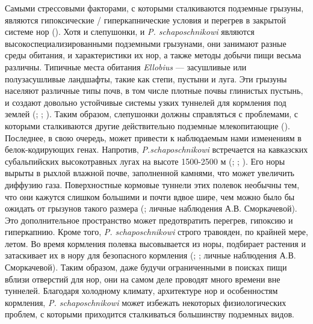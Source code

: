  Самыми стрессовыми факторами, с которыми сталкиваются подземные грызуны, являются гипоксические / гиперкапнические условия и перегрев в закрытой системе нор (\cite{Lacey2000}). Хотя и слепушонки, и \textit{P. schaposchnikowi} являются высокоспециализированными подземными грызунами, они занимают разные среды обитания, и характеристики их нор, а также методы добычи пищи весьма различны. Типичные места обитания \textit{Ellobius} --- засушливые или полузасушливые ландшафты, такие как степи, пустыни и луга. Эти грызуны населяют различные типы почв, в том числе плотные почвы глинистых пустынь, и создают довольно устойчивые системы узких туннелей для кормления под землей (\cite{Ognev1950}; \cite{Gromov1977}; \cite{Shubin1978}). Таким образом, слепушонки должны справляться с проблемами, с которыми сталкиваются другие действительно подземные млекопитающие (\cite{Lacey2000}). Последнее, в свою очередь, может привести к наблюдаемым нами изменениям в белок-кодирующих генах. Напротив, \textit{P.schaposchnikowi} встречается на кавказских субальпийских высокотравных лугах на высоте 1500-2500 м (\cite{Vereshchagin1959}; \cite{Vorontsov1966}; \cite{Krystufek2005}). Его норы вырыты в рыхлой влажной почве, заполненной камнями, что может увеличить диффузию газа. Поверхностные кормовые туннели этих полевок необычны тем, что они кажутся слишком большими и почти вдвое шире, чем можно было бы ожидать от грызунов такого размера (\cite{Vorontsov1966}; личные наблюдения А.В. Сморкачевой). Это дополнительное пространство может предотвратить перегрев, гипоксию и гиперкапнию. Кроме того, \textit{P. schaposchnikowi} строго травояден, по крайней мере, летом. Во время кормления полевка высовывается из норы, подбирает растения и затаскивает их в нору для безопасного кормления (\cite{Gambaryan1957}; \cite{Zimina1977}; личные наблюдения А.В. Сморкачевой). Таким образом, даже будучи ограниченными в поисках пищи вблизи отверстий для нор, они на самом деле проводят много времени вне туннелей. Благодаря холодному климату, архитектуре нор и особенностям кормления, \textit{P. schaposchnikowi} может избежать некоторых физиологических проблем, с которыми приходится сталкиваться большинству подземных видов.


